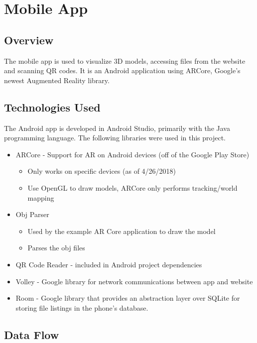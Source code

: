 
\section{Mobile App}

    \subsection{Overview}
The mobile app is used to visualize 3D models, accessing files from the website and scanning QR codes. It is an Android application using ARCore, Google's newest Augmented Reality library.
    \subsection{Technologies Used}
The Android app is developed in Android Studio, primarily with the Java programming language. The following libraries were used in this project.
    \begin{itemize}
        \item ARCore - Support for AR on Android devices (off of the Google Play Store)
        \begin{itemize}
            \item Only works on specific devices (as of 4/26/2018)
            \item Use OpenGL to draw models, ARCore only performs tracking/world mapping
        \end{itemize}
        \item Obj Parser
        \begin{itemize}
            \item Used by the example AR Core application to draw the model
            \item Parses the obj files
        \end{itemize}
        \item QR Code Reader - included in Android project dependencies
        \item Volley - Google library for network communications between app and website
        \item Room - Google library that provides an abstraction layer over SQLite for storing file listings in the phone's database.
    \end{itemize}
    \subsection{Data Flow}

